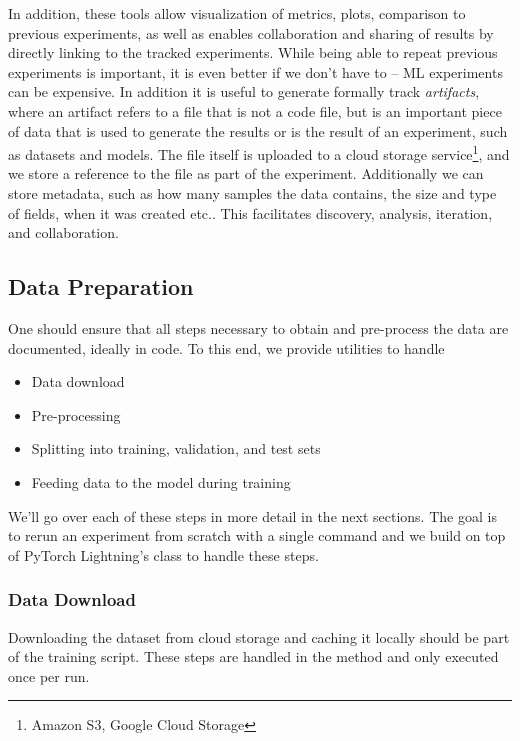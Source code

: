 In addition, these tools allow visualization of metrics, plots, comparison to previous experiments, as well as enables collaboration and sharing of results by directly linking to the tracked experiments.
While being able to repeat previous experiments is important, it is even better if we don't have to -- ML experiments can be expensive.
In addition it is useful to generate formally track \textit{artifacts}, where an artifact refers to a file that is not a code file, but is an important piece of data that is used to generate the results or is the result of an experiment, such as datasets and models.
The file itself is uploaded to a cloud storage service\footnote{Amazon S3, Google Cloud Storage}, and we store a reference to the file as part of the experiment.
Additionally we can store metadata, such as how many samples the data contains, the size and type of fields, when it was created etc..
This facilitates discovery, analysis, iteration, and collaboration.


\subsection{Data Preparation}
One should ensure that all steps necessary to obtain and pre-process the data are documented, ideally in code.
To this end, we provide utilities to handle
\begin{itemize}
    \item Data download
    \item Pre-processing
    \item Splitting into training, validation, and test sets
    \item Feeding data to the model during training
\end{itemize}

We'll go over each of these steps in more detail in the next sections.
The goal is to rerun an experiment from scratch with a single command and we build on top of PyTorch Lightning's  class to handle these steps.
\subsubsection{Data Download}
Downloading the dataset from cloud storage and caching it locally should be part of the training script.
These steps are handled in the  method and only executed once per run.

